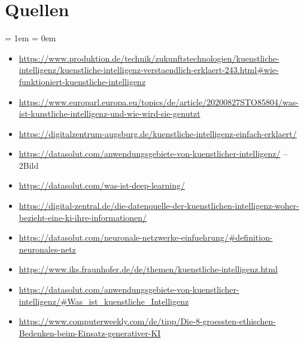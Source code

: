 \documentclass{report}
\begin{document}
\section{Quellen}
\parskip = 1em %
\parindent = 0em %


\begin{itemize}
\item \url{https://www.produktion.de/technik/zukunftstechnologien/kuenstliche-intelligenz/kuenstliche-intelligenz-verstaendlich-erklaert-243.html#wie-funktioniert-kuenstliche-intelligenz}
\item \url{https://www.europarl.europa.eu/topics/de/article/20200827STO85804/was-ist-kunstliche-intelligenz-und-wie-wird-sie-genutzt}
\item \url{https://digitalzentrum-augsburg.de/kuenstliche-intelligenz-einfach-erklaert/}
\item \url{https://datasolut.com/anwendungsgebiete-von-kuenstlicher-intelligenz/} -- 2Bild
\item \url{https://datasolut.com/was-ist-deep-learning/} 
\item \url{https://digital-zentral.de/die-datenquelle-der-kuenstlichen-intelligenz-woher-bezieht-eine-ki-ihre-informationen/}
\item \url{https://datasolut.com/neuronale-netzwerke-einfuehrung/#definition-neuronales-netz}
\item \url{https://www.iks.fraunhofer.de/de/themen/kuenstliche-intelligenz.html}
\item \url{https://datasolut.com/anwendungsgebiete-von-kuenstlicher-intelligenz/#Was_ist_kuenstliche_Intelligenz}
\item \url{https://www.computerweekly.com/de/tipp/Die-8-groessten-ethischen-Bedenken-beim-Einsatz-generativer-KI}
\end{itemize}

\printbibliography
\end{document}
